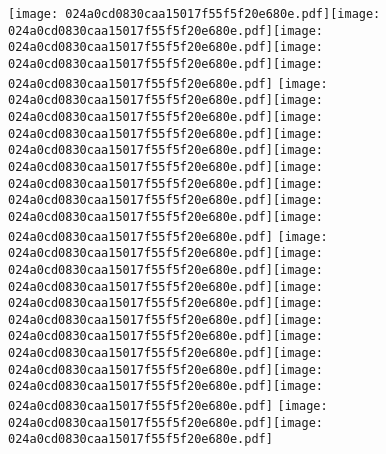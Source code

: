 \documentclass{article}
\newcommand{\origpg}[2]{\texttt{[image: 024a0cd0830caa15017f55f5f20e680e.pdf]}}
\begin{document}
{\vspace{19.995pt}\origpg4{85.303pt 189.88pt 93.938pt 206.02pt}\origpg4{93.938pt 189.88pt 101.1pt 206.02pt}\hspace{-0.145pt}\origpg4{100.96pt 189.88pt 109.01pt 206.02pt}\origpg4{108.92pt 189.88pt 116.99pt 206.02pt}\hspace{-0.355pt}\origpg4{116.63pt 189.88pt 126.85pt 206.02pt} \origpg4{135.68pt 189.88pt 143.75pt 206.02pt}\origpg4{143.84pt 189.88pt 151.01pt 206.02pt}\origpg4{151.06pt 189.88pt 157.43pt 206.02pt}\hspace{-0.355pt}\origpg4{157.08pt 189.88pt 165.15pt 206.02pt}\hspace{-0.839pt}\origpg4{164.31pt 189.88pt 172.36pt 206.02pt}\origpg4{172.27pt 189.88pt 179.63pt 206.02pt}\hspace{-0.613pt}\origpg4{179.01pt 189.88pt 186.07pt 206.02pt}\hspace{0.161pt}\origpg4{186.23pt 189.88pt 193.39pt 206.02pt}\hspace{-0.42pt}\origpg4{192.97pt 189.88pt 200.03pt 206.02pt} \origpg4{208.86pt 189.88pt 216.93pt 206.02pt}\hspace{-0.355pt}\origpg4{216.57pt 189.88pt 223.63pt 206.02pt}\hspace{-0.549pt}\origpg4{223.08pt 189.88pt 231.13pt 206.02pt}\origpg4{231.03pt 189.88pt 239.67pt 206.02pt}\origpg4{239.67pt 189.88pt 247.79pt 206.02pt}\origpg4{247.88pt 189.88pt 255.05pt 206.02pt}\origpg4{255.1pt 189.88pt 262.27pt 206.02pt}\hspace{-0.178pt}\origpg4{262.09pt 189.88pt 269.14pt 206.02pt}\hspace{0.161pt}\origpg4{269.3pt 189.88pt 276.47pt 206.02pt}\origpg4{276.52pt 189.88pt 283.94pt 206.02pt} \origpg4{292.88pt 189.88pt 300.95pt 206.02pt}\hspace{-0.355pt}\origpg4{300.6pt 189.88pt 307.65pt 206.02pt} 

}
\end{document}

